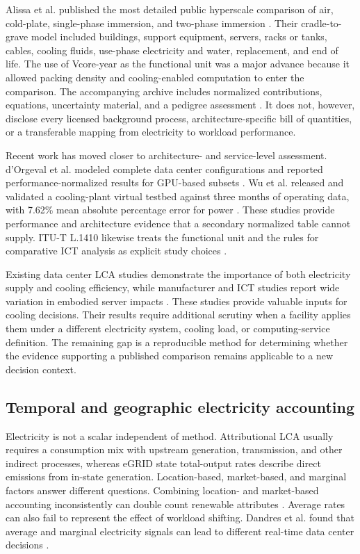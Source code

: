 \documentclass[review,a4paper,fleqn]{cas-sc}
\begin{document}
Alissa et al. published the most detailed public hyperscale comparison of air, cold-plate, single-phase immersion, and two-phase immersion \cite{ref14}. Their cradle-to-grave model included buildings, support equipment, servers, racks or tanks, cables, cooling fluids, use-phase electricity and water, replacement, and end of life. The use of Vcore-year as the functional unit was a major advance because it allowed packing density and cooling-enabled computation to enter the comparison. The accompanying archive includes normalized contributions, equations, uncertainty material, and a pedigree assessment \cite{ref15}. It does not, however, disclose every licensed background process, architecture-specific bill of quantities, or a transferable mapping from electricity to workload performance.

Recent work has moved closer to architecture- and service-level assessment. d'Orgeval et al. modeled complete data center configurations and reported performance-normalized results for GPU-based subsets \cite{ref16}. Wu et al. released and validated a cooling-plant virtual testbed against three months of operating data, with 7.62\% mean absolute percentage error for power \cite{ref17}. These studies provide performance and architecture evidence that a secondary normalized table cannot supply. ITU-T L.1410 likewise treats the functional unit and the rules for comparative ICT analysis as explicit study choices \cite{ref18}.

Existing data center LCA studies demonstrate the importance of both electricity supply and cooling efficiency, while manufacturer and ICT studies report wide variation in embodied server impacts \cite{ref19,ref20,ref21}. These studies provide valuable inputs for cooling decisions. Their results require additional scrutiny when a facility applies them under a different electricity system, cooling load, or computing-service definition. The remaining gap is a reproducible method for determining whether the evidence supporting a published comparison remains applicable to a new decision context.

\subsection{Temporal and geographic electricity accounting}
Electricity is not a scalar independent of method. Attributional LCA usually requires a consumption mix with upstream generation, transmission, and other indirect processes, whereas eGRID state total-output rates describe direct emissions from in-state generation. Location-based, market-based, and marginal factors answer different questions. Combining location- and market-based accounting inconsistently can double count renewable attributes \cite{ref22,ref23}. Average rates can also fail to represent the effect of workload shifting. Dandres et al. found that average and marginal electricity signals can lead to different real-time data center decisions \cite{ref24}.
\end{document}
